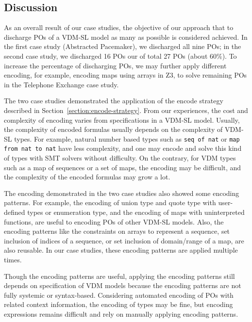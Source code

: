\subsection{Discussion}

As an overall result of our case studies, the objective of our approach that to discharge POs of a VDM-SL model as many as possible is considered achieved. In the first case study (Abstracted Pacemaker), we discharged all nine POs; in the second case study, we discharged 16 POs our of total 27 POs (about 60\%). To increase the percentage of discharging POs, we may further apply different encoding, for example, encoding maps using arrays in Z3, to solve remaining POs in the Telephone Exchange case study.

The two case studies demonstrated the application of the encode strategy described in Section~\ref{section:encode-strategy}. From our experiences, the cost and complexity of encoding varies from specifications in a VDM-SL model. Usually, the complexity of encoded formulas usually depends on the complexity of VDM-SL types. For example, natural number based types such as {\tt seq of nat} or {\tt map from nat to nat} have less complexity, and one may encode and solve this kind of types with SMT solvers without difficulty. On the contrary, for VDM types such as a map of sequences or a set of maps, the encoding may be difficult, and the complexity of the encoded formulas may grow a lot.

The encoding demonstrated in the two case studies also showed some encoding patterns. For example, the encoding of union type and quote type with user-defined types or enumeration type, and the encoding of maps with uninterpreted functions, are useful to encoding POs of other VDM-SL models. Also, the encoding patterns like the constraints on arrays to represent a sequence, set inclusion of indices of a sequence, or set inclusion of domain/range of a map, are also reusable. In our case studies, these encoding patterns are applied multiple times. 

Though the encoding patterns are useful, applying the encoding patterns still depends on specification of VDM models because the encoding patterns are not fully systemic or syntax-based. Considering automated encoding of POs with related context information, the encoding of types may be fine, but encoding expressions remains difficult and rely on manually applying encoding patterns.


